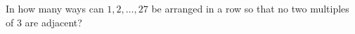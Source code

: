 In how many ways can $1,2,\dots,27$ be arranged in a row so that no two multiples of $3$ are adjacent?
